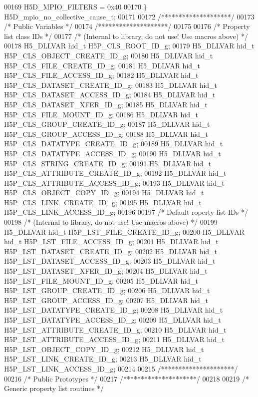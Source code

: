\begin{DoxyCode}
00169     H5D\_MPIO\_FILTERS = 0x40
00170 \} H5D\_mpio\_no\_collective\_cause\_t;
00171 
00172 \textcolor{comment}{/********************/}
00173 \textcolor{comment}{/* Public Variables */}
00174 \textcolor{comment}{/********************/}
00175 
00176 \textcolor{comment}{/* Property list class IDs */}
00177 \textcolor{comment}{/* (Internal to library, do not use!  Use macros above) */}
00178 H5\_DLLVAR hid\_t H5P\_CLS\_ROOT\_ID\_g;
00179 H5\_DLLVAR hid\_t H5P\_CLS\_OBJECT\_CREATE\_ID\_g;
00180 H5\_DLLVAR hid\_t H5P\_CLS\_FILE\_CREATE\_ID\_g;
00181 H5\_DLLVAR hid\_t H5P\_CLS\_FILE\_ACCESS\_ID\_g;
00182 H5\_DLLVAR hid\_t H5P\_CLS\_DATASET\_CREATE\_ID\_g;
00183 H5\_DLLVAR hid\_t H5P\_CLS\_DATASET\_ACCESS\_ID\_g;
00184 H5\_DLLVAR hid\_t H5P\_CLS\_DATASET\_XFER\_ID\_g;
00185 H5\_DLLVAR hid\_t H5P\_CLS\_FILE\_MOUNT\_ID\_g;
00186 H5\_DLLVAR hid\_t H5P\_CLS\_GROUP\_CREATE\_ID\_g;
00187 H5\_DLLVAR hid\_t H5P\_CLS\_GROUP\_ACCESS\_ID\_g;
00188 H5\_DLLVAR hid\_t H5P\_CLS\_DATATYPE\_CREATE\_ID\_g;
00189 H5\_DLLVAR hid\_t H5P\_CLS\_DATATYPE\_ACCESS\_ID\_g;
00190 H5\_DLLVAR hid\_t H5P\_CLS\_STRING\_CREATE\_ID\_g;
00191 H5\_DLLVAR hid\_t H5P\_CLS\_ATTRIBUTE\_CREATE\_ID\_g;
00192 H5\_DLLVAR hid\_t H5P\_CLS\_ATTRIBUTE\_ACCESS\_ID\_g;
00193 H5\_DLLVAR hid\_t H5P\_CLS\_OBJECT\_COPY\_ID\_g;
00194 H5\_DLLVAR hid\_t H5P\_CLS\_LINK\_CREATE\_ID\_g;
00195 H5\_DLLVAR hid\_t H5P\_CLS\_LINK\_ACCESS\_ID\_g;
00196 
00197 \textcolor{comment}{/* Default roperty list IDs */}
00198 \textcolor{comment}{/* (Internal to library, do not use!  Use macros above) */}
00199 H5\_DLLVAR hid\_t H5P\_LST\_FILE\_CREATE\_ID\_g;
00200 H5\_DLLVAR hid\_t H5P\_LST\_FILE\_ACCESS\_ID\_g;
00201 H5\_DLLVAR hid\_t H5P\_LST\_DATASET\_CREATE\_ID\_g;
00202 H5\_DLLVAR hid\_t H5P\_LST\_DATASET\_ACCESS\_ID\_g;
00203 H5\_DLLVAR hid\_t H5P\_LST\_DATASET\_XFER\_ID\_g;
00204 H5\_DLLVAR hid\_t H5P\_LST\_FILE\_MOUNT\_ID\_g;
00205 H5\_DLLVAR hid\_t H5P\_LST\_GROUP\_CREATE\_ID\_g;
00206 H5\_DLLVAR hid\_t H5P\_LST\_GROUP\_ACCESS\_ID\_g;
00207 H5\_DLLVAR hid\_t H5P\_LST\_DATATYPE\_CREATE\_ID\_g;
00208 H5\_DLLVAR hid\_t H5P\_LST\_DATATYPE\_ACCESS\_ID\_g;
00209 H5\_DLLVAR hid\_t H5P\_LST\_ATTRIBUTE\_CREATE\_ID\_g;
00210 H5\_DLLVAR hid\_t H5P\_LST\_ATTRIBUTE\_ACCESS\_ID\_g;
00211 H5\_DLLVAR hid\_t H5P\_LST\_OBJECT\_COPY\_ID\_g;
00212 H5\_DLLVAR hid\_t H5P\_LST\_LINK\_CREATE\_ID\_g;
00213 H5\_DLLVAR hid\_t H5P\_LST\_LINK\_ACCESS\_ID\_g;
00214 
00215 \textcolor{comment}{/*********************/}
00216 \textcolor{comment}{/* Public Prototypes */}
00217 \textcolor{comment}{/*********************/}
00218 
00219 \textcolor{comment}{/* Generic property list routines */}

\end{DoxyCode}
